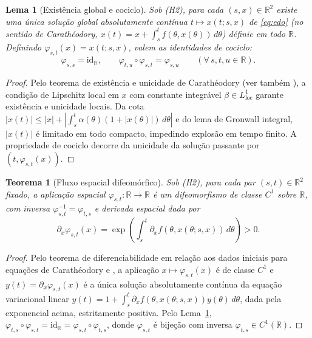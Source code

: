 \documentclass[11pt, a4paper]{article}
\theoremstyle{definition}
\theoremstyle{plain}
\newtheorem{teorema}[definicao]{Teorema}
\newtheorem{lema}[definicao]{Lema}
\theoremstyle{remark}
\begin{document}
\begin{lema}[Existência global e cociclo]\label{lem:3.1}
Sob (H2), para cada $(s, x) \in \mathbb{R}^2$ existe uma única solução global absolutamente contínua $t \mapsto x(t; s, x)$ de \eqref{eq:edo} (no sentido de Carathéodory, $x(t) = x + \int_s^t f(\theta, x(\theta))\,d\theta$) définie em todo $\mathbb{R}$. Definindo $\varphi_{s,t}(x) = x(t; s, x)$, valem as identidades de cociclo:
\[
\varphi_{s,s} = \mathrm{id}_{\mathbb{R}}, \qquad \varphi_{t,u} \circ \varphi_{s,t} = \varphi_{s,u} \qquad (\forall\, s, t, u \in \mathbb{R}).
\]
\end{lema}
\begin{proof}
Pelo teorema de existência e unicidade de Carathéodory \cite[Cap.~2]{CoddingtonLevinson1955} (ver também \cite{Hartman2002}), a condição de Lipschitz local em $x$ com constante integrável $\beta \in L^1_{\text{loc}}$ garante existência e unicidade locais. Da cota $|x(t)| \le |x| + \left|\int_s^t \alpha(\theta)(1 + |x(\theta)|)\,d\theta\right|$ e do lema de Gronwall integral, $|x(t)|$ é limitado em todo compacto, impedindo explosão em tempo finito. A propriedade de cociclo decorre da unicidade da solução passante por $(t, \varphi_{s,t}(x))$.
\end{proof}

\begin{teorema}[Fluxo espacial difeomórfico]\label{teo:3.2}
Sob (H2), para cada par $(s, t) \in \mathbb{R}^2$ fixado, a aplicação espacial $\varphi_{s,t} : \mathbb{R} \to \mathbb{R}$ é um difeomorfismo de classe $C^1$ sobre $\mathbb{R}$, com inversa $\varphi_{s,t}^{-1} = \varphi_{t,s}$ e derivada espacial dada por
\[
\partial_x \varphi_{s,t}(x) = \exp\left(\int_s^t \partial_x f(\theta, x(\theta; s, x))\,d\theta\right) > 0.
\]
\end{teorema}
\begin{proof}
Pelo teorema de diferenciabilidade em relação aos dados iniciais para equações de Carathéodory \cite[Cap.~2, Thm.~4.1]{CoddingtonLevinson1955} e \cite[Cap.~V]{Hartman2002}, a aplicação $x \mapsto \varphi_{s,t}(x)$ é de classe $C^1$ e $y(t) = \partial_x \varphi_{s,t}(x)$ é a única solução absolutamente contínua da equação variacional linear $y(t) = 1 + \int_s^t \partial_x f(\theta, x(\theta; s, x))y(\theta)\,d\theta$, dada pela exponencial acima, estritamente positiva. Pelo Lema~\ref{lem:3.1}, $\varphi_{t,s} \circ \varphi_{s,t} = \mathrm{id}_{\mathbb{R}} = \varphi_{s,t} \circ \varphi_{t,s}$, donde $\varphi_{s,t}$ é bijeção com inversa $\varphi_{t,s} \in C^1(\mathbb{R})$.
\end{proof}
\end{document}
